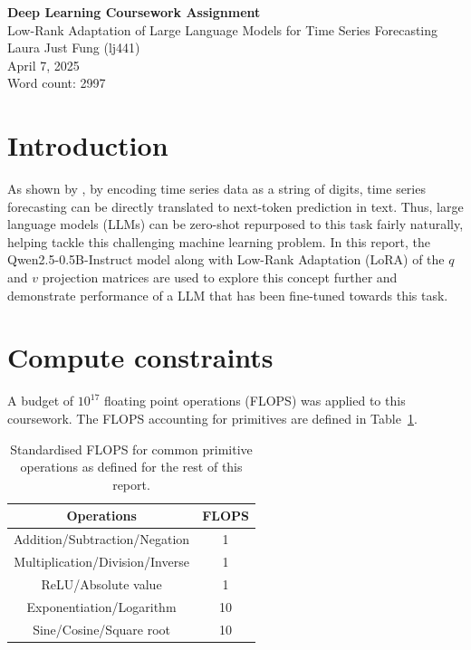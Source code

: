 \documentclass[11pt,a4paper]{article}
\renewcommand{\arraystretch}{0.8}
\begin{document}
 

\begin{center}
    \LARGE{\textbf{Deep Learning Coursework Assignment}}
    \\
    \Large{{Low-Rank Adaptation of Large Language Models for Time Series Forecasting}}
    \\
    \large{Laura Just Fung (lj441)}
    \\
    April 7, 2025
    \\
    Word count: 2997
\end{center}

\section{Introduction}
As shown by \citeauthor{gruver2024largelanguagemodelszeroshot}, by encoding time series data as a string of digits, time series forecasting can be directly translated to next-token prediction in text. Thus, large language models (LLMs) can be zero-shot repurposed to this task fairly naturally, helping tackle this challenging machine learning problem. In this report, the Qwen2.5-0.5B-Instruct model \citep{yang2024qwen2technicalreport} along with Low-Rank Adaptation (LoRA) of the $q$ and $v$ projection matrices are used to explore this concept further and demonstrate performance of a LLM that has been fine-tuned towards this task.

\section{Compute constraints}
\label{sec:constraints}
A budget of $10^{17}$ floating point operations (FLOPS) was applied to this coursework. The FLOPS accounting for primitives are defined in Table~\ref{tab:flops_primitives}.
\renewcommand{\arraystretch}{1.2}
\begin{table}[h]
    \centering
    \begin{tabular}{c|c}
        Operations & FLOPS \\
        \hline
        Addition/Subtraction/Negation & 1 \\
        Multiplication/Division/Inverse & 1 \\
        ReLU/Absolute value & 1 \\
        Exponentiation/Logarithm & 10\\
        Sine/Cosine/Square root & 10 \\
        
    \end{tabular}
    \caption{Standardised FLOPS for common primitive operations as defined for the rest of this report.}
    \label{tab:flops_primitives}
\end{table}
\end{document}
